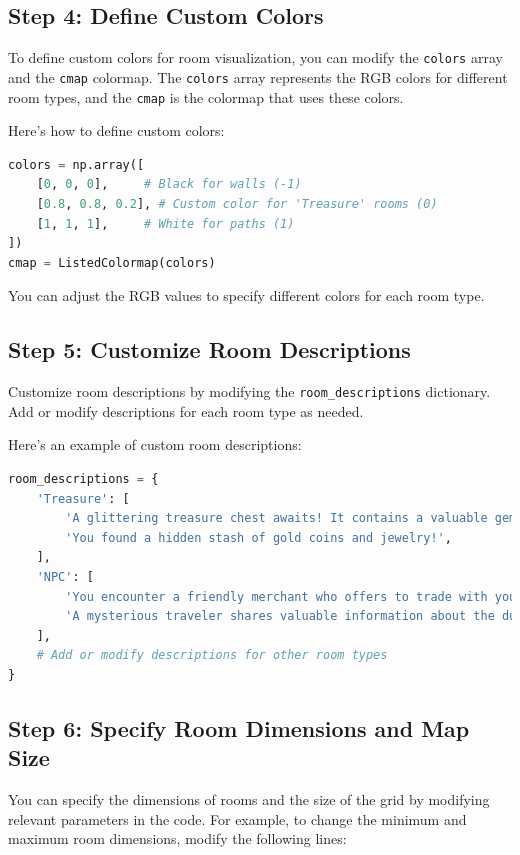 \documentclass[10pt,twocolumn]{article}
\begin{document}
\subsection{Step 4: Define Custom Colors}

To define custom colors for room visualization, you can modify the \texttt{colors} array and the \texttt{cmap} colormap. The \texttt{colors} array represents the RGB colors for different room types, and the \texttt{cmap} is the colormap that uses these colors.

Here's how to define custom colors:

\begin{lstlisting}[language=Python]
colors = np.array([
    [0, 0, 0],     # Black for walls (-1)
    [0.8, 0.8, 0.2], # Custom color for 'Treasure' rooms (0)
    [1, 1, 1],     # White for paths (1)
])
cmap = ListedColormap(colors)
\end{lstlisting}

You can adjust the RGB values to specify different colors for each room type.

\subsection{Step 5: Customize Room Descriptions}

Customize room descriptions by modifying the \texttt{room\_descriptions} dictionary. Add or modify descriptions for each room type as needed.

Here's an example of custom room descriptions:

\begin{lstlisting}[language=Python]
room_descriptions = {
    'Treasure': [
        'A glittering treasure chest awaits! It contains a valuable gem.',
        'You found a hidden stash of gold coins and jewelry!',
    ],
    'NPC': [
        'You encounter a friendly merchant who offers to trade with you.',
        'A mysterious traveler shares valuable information about the dungeon.',
    ],
    # Add or modify descriptions for other room types
}
\end{lstlisting}

\subsection{Step 6: Specify Room Dimensions and Map Size}

You can specify the dimensions of rooms and the size of the grid by modifying relevant parameters in the code. For example, to change the minimum and maximum room dimensions, modify the following lines:
\end{document}
